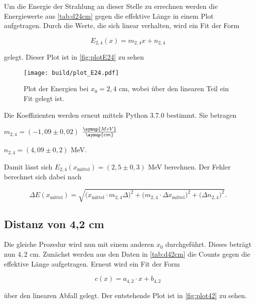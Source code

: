 Um die Energie der Strahlung an dieser Stelle zu errechnen werden die Energiewerte aus \autoref{tab:d24cm} gegen die effektive Länge in einem Plot aufgetragen.
Durch die Werte, die sich linear verhalten, wird ein Fit der Form

\begin{equation}
    E_{2,4}(x) = m_{2,4} x + n_{2,4}
\end{equation}

gelegt. Dieser Plot ist in \autoref{fig:plotE24} zu sehen

\begin{figure}
    \centering
    \texttt{[image: build/plot\_E24.pdf]}
    \caption{Plot der Energien bei $x_0 = 2,4$ cm, wobei über den linearen Teil ein Fit gelegt ist.}
    \label{fig:plotE24}
\end{figure}

Die Koeffizienten werden erneut mittels Python 3.7.0 bestimmt. Sie betragen

\begin{center}
    $m_{2,4} = (-1,09 \pm 0,02)$ $\frac{\symup{MeV}}{\symup{cm}}$

    $n_{2,4} = (4,09 \pm 0,2)$ MeV.
\end{center}

Damit lässt sich $E_{2,4}(x_\text{mittel}) = (2,5 \pm 0,3)$ MeV berechnen. Der Fehler berechnet sich dabei nach

\begin{equation}
    \Delta E(x_\text{mittel}) = \sqrt{\bigg( x_\text{mittel} \cdot m_{2,4} \Delta \bigg)^2 + \bigg(m_{2,4} \cdot \Delta x_\text{mittel} \bigg)^2 + \bigg( \Delta n_{2,4} \bigg)^2}.
\end{equation}



\subsection{Distanz von 4,2 cm}

Die gleiche Prozedur wird nun mit einem anderen $x_0$ durchgeführt. Dieses beträgt nun $4,2$ cm.
Zunächst werden aus den Daten in \autoref{tab:d42cm} die Counts gegen die effektive Länge aufgetragen. Erneut wird ein Fit der Form

\begin{equation}
    c(x) = a_{4,2} \cdot x + b_{4,2}
\end{equation}

über den linearen Abfall gelegt. Der entstehende Plot ist in \autoref{fig:plot42} zu sehen.

